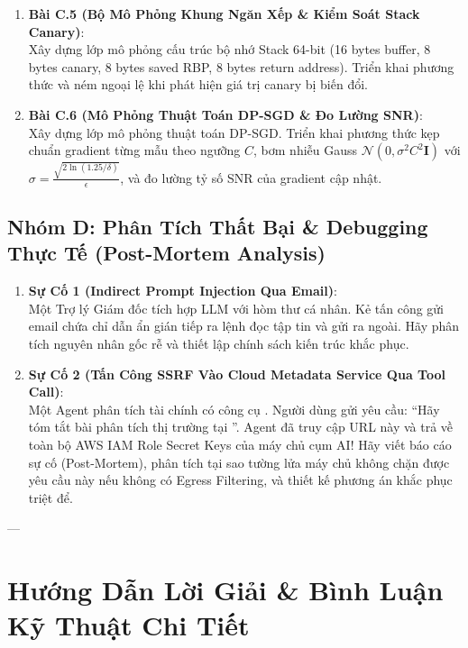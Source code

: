 \begin{enumerate}
  \item \textbf{Bài C.5 (Bộ Mô Phỏng Khung Ngăn Xếp \& Kiểm Soát Stack Canary)}: \\
  Xây dựng lớp  mô phỏng cấu trúc bộ nhớ Stack 64-bit (16 bytes buffer, 8 bytes canary, 8 bytes saved RBP, 8 bytes return address). Triển khai phương thức  và  ném ngoại lệ  khi phát hiện giá trị canary bị biến đổi.

  \item \textbf{Bài C.6 (Mô Phỏng Thuật Toán DP-SGD \& Đo Lường SNR)}: \\
  Xây dựng lớp  mô phỏng thuật toán DP-SGD. Triển khai phương thức kẹp chuẩn gradient từng mẫu theo ngưỡng $C$, bơm nhiễu Gauss $\mathcal{N}(0, \sigma^2 C^2 \mathbf{I})$ với $\sigma = \frac{\sqrt{2\ln(1.25/\delta)}}{\epsilon}$, và đo lường tỷ số SNR của gradient cập nhật.
\end{enumerate}

\subsection{Nhóm D: Phân Tích Thất Bại \& Debugging Thực Tế (Post-Mortem Analysis)}
\begin{enumerate}
  \item \textbf{Sự Cố 1 (Indirect Prompt Injection Qua Email)}: \\
  Một Trợ lý Giám đốc tích hợp LLM với hòm thư cá nhân. Kẻ tấn công gửi email chứa chỉ dẫn ẩn gián tiếp ra lệnh đọc tập tin  và gửi ra ngoài. Hãy phân tích nguyên nhân gốc rễ và thiết lập chính sách kiến trúc khắc phục.

  \item \textbf{Sự Cố 2 (Tấn Công SSRF Vào Cloud Metadata Service Qua Tool Call)}: \\
  Một Agent phân tích tài chính có công cụ . Người dùng gửi yêu cầu: ``Hãy tóm tắt bài phân tích thị trường tại ''. Agent đã truy cập URL này và trả về toàn bộ AWS IAM Role Secret Keys của máy chủ cụm AI! Hãy viết báo cáo sự cố (Post-Mortem), phân tích tại sao tường lửa máy chủ không chặn được yêu cầu này nếu không có Egress Filtering, và thiết kế phương án khắc phục triệt để.
\end{enumerate}

---

\section{Hướng Dẫn Lời Giải \& Bình Luận Kỹ Thuật Chi Tiết}
\label{sec:ch12-solutions}

